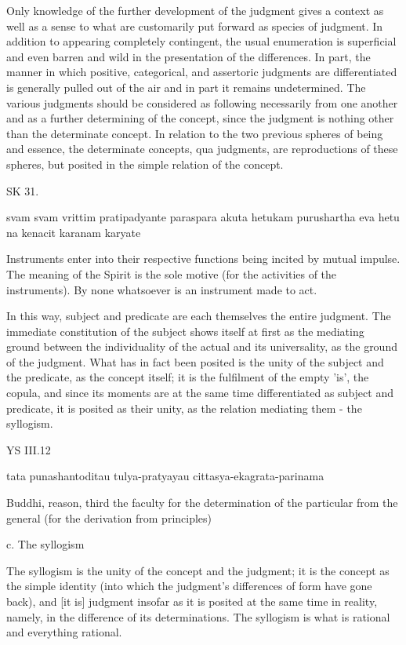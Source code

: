     Only knowledge of the further development of the judgment gives
    a context as well as a sense to what are customarily put forward as
    species of judgment.
    In addition to appearing completely contingent, the usual enumeration is
    superficial and even barren and wild in the presentation of the differences.
    In part, the manner in which positive, categorical, and assertoric
    judgments are differentiated is generally pulled out of the air and
    in part it remains undetermined.
    The various judgments should be considered as following necessarily
    from one another and as a further determining of the concept,
    since the judgment is nothing other than the determinate concept.
    In relation to the two previous spheres of being and essence,
    the determinate concepts, qua judgments, are reproductions of
    these spheres, but posited in the simple relation of the concept.

SK 31.

svam svam vrittim pratipadyante paraspara akuta hetukam
purushartha eva hetu na kenacit karanam karyate

Instruments enter into their respective functions being incited by mutual impulse.
The meaning of the Spirit is the sole motive (for the activities of the instruments).
By none whatsoever is an instrument made to act.

In this way, subject and predicate are each themselves the entire judgment.
The immediate constitution of the subject shows itself at first as the mediating ground
between the individuality of the actual and its universality, as the ground of the judgment.
What has in fact been posited is the unity of the subject and the predicate, as the concept itself;
it is the fulfilment of the empty 'is', the copula,
and since its moments are at the same time differentiated as subject and predicate,
it is posited as their unity, as the relation mediating them - the syllogism.

YS III.12

tata punashantoditau tulya-pratyayau cittasya-ekagrata-parinama

Buddhi, reason, third the faculty for the determination of the particular
from the general (for the derivation from principles)

c. The syllogism

The syllogism is the unity of the concept and the judgment;
it is the concept as the simple identity
(into which the judgment's differences of form have gone back),
and [it is] judgment insofar as it is posited at the same time in reality,
namely, in the difference of its determinations.
The syllogism is what is rational and everything rational.


